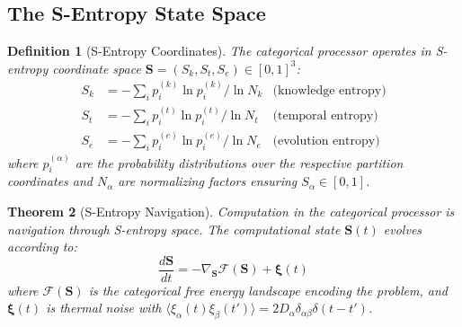 \documentclass[twocolumn,10pt]{article}
\newtheorem{theorem}{Theorem}[section]
\newtheorem{definition}[theorem]{Definition}
\theoremstyle{remark}
\newcommand{\Sk}{S_k}
\newcommand{\St}{S_t}
\newcommand{\Se}{S_e}
\newcommand{\Scoord}{\mathbf{S}}
\begin{document}
\subsection{The S-Entropy State Space}

\begin{definition}[S-Entropy Coordinates]
\label{def:s_entropy}
The categorical processor operates in S-entropy coordinate space $\Scoord = (\Sk, \St, \Se) \in [0,1]^3$:
\begin{align}
    \Sk &= -\sum_i p_i^{(k)} \ln p_i^{(k)} / \ln N_k & \text{(knowledge entropy)} \\
    \St &= -\sum_i p_i^{(t)} \ln p_i^{(t)} / \ln N_t & \text{(temporal entropy)} \\
    \Se &= -\sum_i p_i^{(e)} \ln p_i^{(e)} / \ln N_e & \text{(evolution entropy)}
\end{align}
where $p_i^{(\alpha)}$ are the probability distributions over the respective partition coordinates and $N_\alpha$ are normalizing factors ensuring $S_\alpha \in [0,1]$.
\end{definition}

\begin{theorem}[S-Entropy Navigation]
\label{thm:navigation}
Computation in the categorical processor is navigation through S-entropy space. The computational state $\Scoord(t)$ evolves according to:
\begin{equation}
    \frac{d\Scoord}{dt} = -\nabla_{\Scoord} \mathcal{F}(\Scoord) + \boldsymbol{\xi}(t)
\end{equation}
where $\mathcal{F}(\Scoord)$ is the categorical free energy landscape encoding the problem, and $\boldsymbol{\xi}(t)$ is thermal noise with $\langle \xi_\alpha(t) \xi_\beta(t') \rangle = 2D_\alpha \delta_{\alpha\beta}\delta(t-t')$.
\end{theorem}
\end{document}
